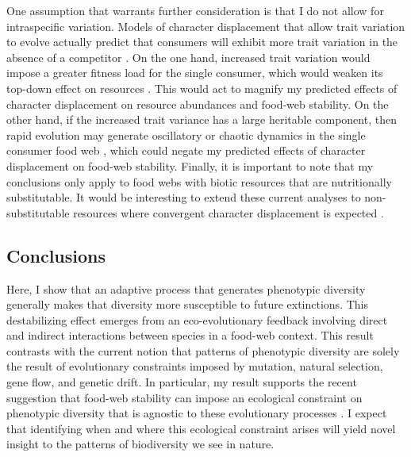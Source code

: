 \documentclass[11pt,]{article}
\begin{document}
One assumption that warrants further consideration is that I do not
allow for intraspecific variation. Models of character displacement that
allow trait variation to evolve actually predict that consumers will
exhibit more trait variation in the absence of a competitor
\citep{Taper1985}. On the one hand, increased trait variation would
impose a greater fitness load for the single consumer, which would
weaken its top-down effect on resources \citep{Schreiber2011}. This
would act to magnify my predicted effects of character displacement on
resource abundances and food-web stability. On the other hand, if the
increased trait variance has a large heritable component, then rapid
evolution may generate oscillatory or chaotic dynamics in the single
consumer food web \citep{Schreiber2011}, which could negate my predicted
effects of character displacement on food-web stability. Finally, it is
important to note that my conclusions only apply to food webs with
biotic resources that are nutritionally substitutable. It would be
interesting to extend these current analyses to non-substitutable
resources where convergent character displacement is expected
\citep{Abrams1987, Fox2008}.

\subsection{Conclusions}\label{conclusions}

Here, I show that an adaptive process that generates phenotypic
diversity generally makes that diversity more susceptible to future
extinctions. This destabilizing effect emerges from an eco-evolutionary
feedback involving direct and indirect interactions between species in a
food-web context. This result contrasts with the current notion that
patterns of phenotypic diversity are solely the result of evolutionary
constraints imposed by mutation, natural selection, gene flow, and
genetic drift. In particular, my result supports the recent suggestion
that food-web stability can impose an ecological constraint on
phenotypic diversity that is agnostic to these evolutionary processes
\citep{Borrelli2015b}. I expect that identifying when and where this
ecological constraint arises will yield novel insight to the patterns of
biodiversity we see in nature.


\end{document}
